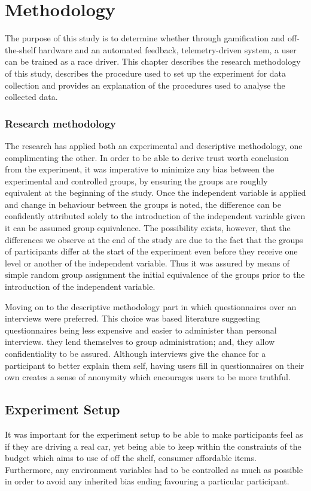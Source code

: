 \section{Methodology}
The purpose of this study is to determine whether through gamification and off-the-shelf hardware and an automated feedback, telemetry-driven system, a user can be trained as a race driver. This chapter describes the research methodology of this study, describes the procedure used to set up the experiment for data collection and provides an explanation of the procedures used to analyse the collected data.

\subsubsection{Research methodology}
The research has applied both an experimental and descriptive methodology, one complimenting the other. In order to be able to derive trust worth conclusion from the experiment, it was imperative to minimize any bias between the experimental and controlled groups, by ensuring the groups are roughly equivalent at the beginning of the study. Once the independent variable is applied and change in behaviour between the groups is noted, the difference can be confidently attributed solely to the introduction of the independent variable given it can be assumed group equivalence. The possibility exists, however, that the differences we observe at the end of the study are due to the fact that the groups of participants differ at the start of the experiment even before they receive one level or another of the independent variable. Thus it was assured by means of simple random group assignment the initial equivalence of the groups prior to the introduction of the independent variable\cite{introductiontobehavioralresearchmethods}.

Moving on to the descriptive methodology part in which questionnaires over an interviews were preferred. This choice was based literature suggesting questionnaires being less expensive and easier to administer than personal interviews. they lend themselves to group administration; and, they allow confidentiality to be assured. Although interviews give the chance for a participant to better explain them self, having users fill in questionnaires on their own creates a sense of anonymity which encourages users to be more truthful\cite{introductiontobehavioralresearchmethods}. 

\subsection{Experiment Setup}
It was important for the experiment setup to be able to make participants feel as if they are driving a real car, yet being able to keep within the constraints of the budget which aims to use of off the shelf, consumer affordable items. Furthermore, any environment variables had to be controlled as much as possible in order to avoid any inherited bias ending favouring a particular participant.

